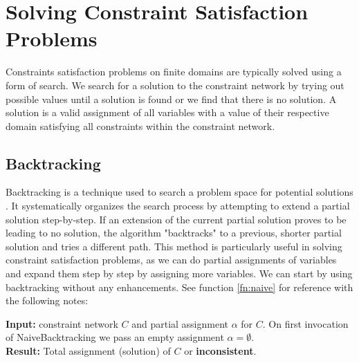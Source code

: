 \chapter{Solving Constraint Satisfaction Problems} \label{chap:solveCSP}

Constraints satisfaction problems on finite domains are typically solved using a form of search. We search for a solution to the constraint network by trying out possible values until a solution is found or we find that there is no solution. A solution is a valid assignment of all variables with a value of their respective domain satisfying all constraints within the constraint network.

\section{Backtracking}

Backtracking is a technique used to search a problem space for potential solutions \cite{backtracking:1975}. It systematically organizes the search process by attempting to extend a partial solution step-by-step. If an extension of the current partial solution proves to be leading to no solution, the algorithm "backtracks" to a previous, shorter partial solution and tries a different path. This method is particularly useful in solving constraint satisfaction problems, as we can do partial assignments of variables and expand them step by step by assigning more variables. We can start by using backtracking without any enhancements. See function \ref{fn:naive} for reference with the following notes:

\textbf{Input:} constraint network $C$ and partial assignment $\alpha$ for $C$. On first invocation of NaiveBacktracking we pass an empty assignment $\alpha = \emptyset$. \\
\textbf{Result:} Total assignment (solution) of $C$ or \textbf{inconsistent}.\\

